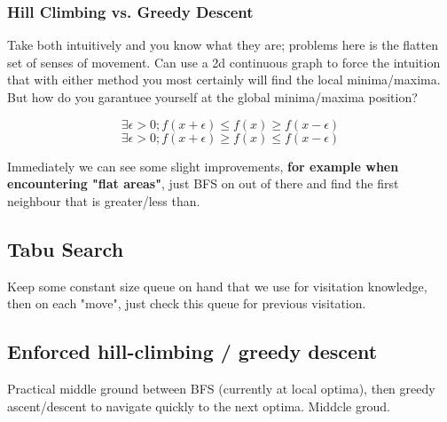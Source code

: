 \documentclass{article}
\begin{document}
\subsubsection*{Hill Climbing vs. Greedy Descent}
Take both intuitively and you know what they are; problems here is the flatten set of senses of movement. Can use a 2d continuous graph to force the intuition that with either method you most certainly will find the local minima/maxima. But how do you garantuee yourself at the global minima/maxima position?

\begin{equation}
	\exists \epsilon > 0; f(x+\epsilon) \leq f(x) \geq f(x-\epsilon)
\end{equation}
\begin{equation}
	\exists \epsilon > 0; f(x+\epsilon) \geq f(x) \leq f(x-\epsilon)
\end{equation}


Immediately we can see some slight improvements, \textbf{for example when encountering "flat areas"}, just BFS on out of there and find the first neighbour that is greater/less than.

\subsection*{Tabu Search}
Keep some constant size queue on hand that we use for visitation knowledge, then on each "move", just check this queue for previous visitation.

\subsection{Enforced hill-climbing / greedy descent}
Practical middle ground between BFS (currently at local optima), then greedy ascent/descent to navigate quickly to the next optima. Middcle groud.
\end{document}
